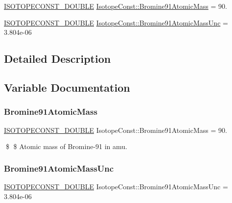 \begin{DoxyCompactItemize}
\item 
\mbox{\hyperlink{group___isotope_const-_macros_ga8f45a7272ce02c0b4c65c44636ed719a}{I\+S\+O\+T\+O\+P\+E\+C\+O\+N\+S\+T\+\_\+\+D\+O\+U\+B\+LE}} \mbox{\hyperlink{group___isotope_const-_bromine-_br91_ga3f1a4e8207d7571264f4fb724b0ac6aa}{Isotope\+Const\+::\+Bromine91\+Atomic\+Mass}} = 90.
\item 
\mbox{\hyperlink{group___isotope_const-_macros_ga8f45a7272ce02c0b4c65c44636ed719a}{I\+S\+O\+T\+O\+P\+E\+C\+O\+N\+S\+T\+\_\+\+D\+O\+U\+B\+LE}} \mbox{\hyperlink{group___isotope_const-_bromine-_br91_ga28ba3246cfff372de61d55c5a2cef1b6}{Isotope\+Const\+::\+Bromine91\+Atomic\+Mass\+Unc}} = 3.\+804e-\/06
\end{DoxyCompactItemize}


\subsection{Detailed Description}


\subsection{Variable Documentation}
\mbox{\label{group___isotope_const-_bromine-_br91_ga3f1a4e8207d7571264f4fb724b0ac6aa}} 
\subsubsection{\texorpdfstring{Bromine91\+Atomic\+Mass}{Bromine91AtomicMass}}
{\footnotesize\ttfamily \mbox{\hyperlink{group___isotope_const-_macros_ga8f45a7272ce02c0b4c65c44636ed719a}{I\+S\+O\+T\+O\+P\+E\+C\+O\+N\+S\+T\+\_\+\+D\+O\+U\+B\+LE}} Isotope\+Const\+::\+Bromine91\+Atomic\+Mass = 90.}

\$ \$ Atomic mass of Bromine-\/91 in amu. \mbox{\label{group___isotope_const-_bromine-_br91_ga28ba3246cfff372de61d55c5a2cef1b6}} 
\subsubsection{\texorpdfstring{Bromine91\+Atomic\+Mass\+Unc}{Bromine91AtomicMassUnc}}
{\footnotesize\ttfamily \mbox{\hyperlink{group___isotope_const-_macros_ga8f45a7272ce02c0b4c65c44636ed719a}{I\+S\+O\+T\+O\+P\+E\+C\+O\+N\+S\+T\+\_\+\+D\+O\+U\+B\+LE}} Isotope\+Const\+::\+Bromine91\+Atomic\+Mass\+Unc = 3.\+804e-\/06}

